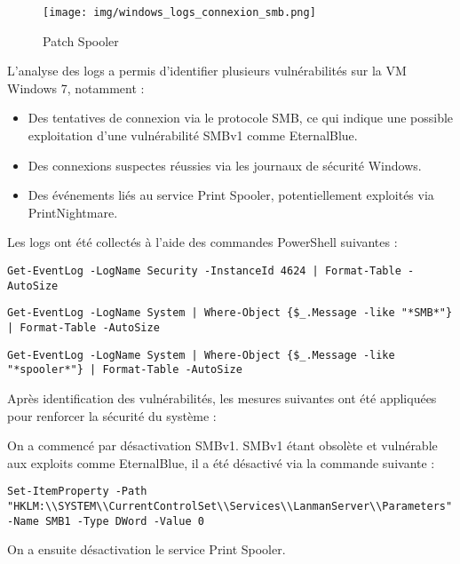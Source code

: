\documentclass[a4paper,12pt]{report}
\begin{document}
\begin{enumerate}
 \begin{figure}[H]
    \centering
    \texttt{[image: img/windows\_logs\_connexion\_smb.png]}
    \caption{Patch Spooler }
\end{figure}
    L'analyse des logs a permis d'identifier plusieurs vulnérabilités sur la VM Windows 7, notamment :
\begin{itemize}
    \item Des tentatives de connexion via le protocole SMB, ce qui indique une possible exploitation d'une vulnérabilité SMBv1 comme EternalBlue.
    \item Des connexions suspectes réussies via les journaux de sécurité Windows.
    \item Des événements liés au service Print Spooler, potentiellement exploités via PrintNightmare.
\end{itemize}

Les logs ont été collectés à l'aide des commandes PowerShell suivantes :
\begin{lstlisting}
Get-EventLog -LogName Security -InstanceId 4624 | Format-Table -AutoSize
\end{lstlisting}

\begin{lstlisting}
Get-EventLog -LogName System | Where-Object {$_.Message -like "*SMB*"} | Format-Table -AutoSize
\end{lstlisting}

\begin{lstlisting}
Get-EventLog -LogName System | Where-Object {$_.Message -like "*spooler*"} | Format-Table -AutoSize
\end{lstlisting}


Après identification des vulnérabilités, les mesures suivantes ont été appliquées pour renforcer la sécurité du système :

On a commencé par désactivation SMBv1.
SMBv1 étant obsolète et vulnérable aux exploits comme EternalBlue, il a été désactivé via la commande suivante :
\begin{lstlisting}
Set-ItemProperty -Path "HKLM:\\SYSTEM\\CurrentControlSet\\Services\\LanmanServer\\Parameters" -Name SMB1 -Type DWord -Value 0
\end{lstlisting}

On a ensuite désactivation le service Print Spooler.


\end{enumerate}
\end{document}
